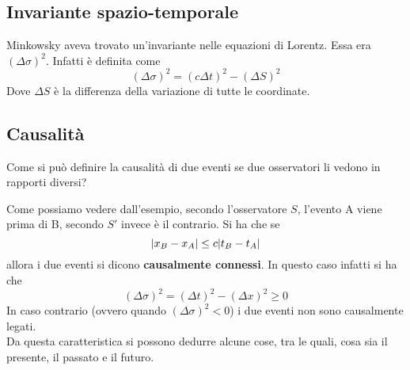 \subsection{Invariante spazio-temporale}
Minkowsky aveva trovato un'invariante nelle equazioni di Lorentz. Essa era $(\Delta\sigma)^2$. 
Infatti è definita come
\begin{equation*}
  {(\Delta\sigma)}^2={(c\Delta t)}^2-{(\Delta S)}^2
\end{equation*}
Dove $\Delta S$ è la differenza della variazione di tutte le coordinate.

\subsection{Causalità}
Come si può definire la causalità di due eventi se due osservatori li vedono in rapporti diversi?
\begin{center}
\end{center}
Come possiamo vedere dall'esempio, secondo l'osservatore $S$, l'evento A viene prima di B, secondo
$S'$ invece è il contrario. Si ha che se 
\begin{equation*}
  \lvert x_B-x_A\rvert\leq c\lvert t_B-t_A\rvert
\end{equation*}
allora i due eventi si dicono \textbf{causalmente connessi}. In questo caso infatti si ha che
\begin{equation*}
  \left( \Delta\sigma \right)^2=\left( \Delta t \right)^2-\left( \Delta x \right)^2\geq0
\end{equation*}
In caso contrario (ovvero quando $(\Delta\sigma)^2<0$) i due eventi non sono causalmente legati.\\
Da questa caratteristica si possono dedurre alcune cose, tra le quali, cosa sia il presente, il
passato e il futuro.
